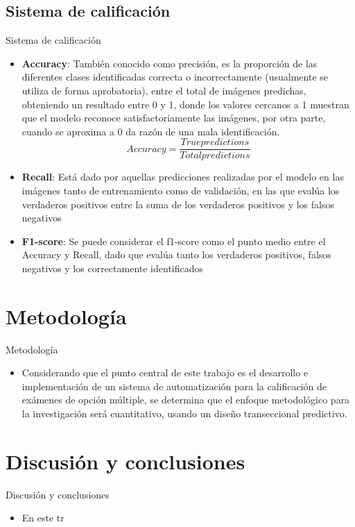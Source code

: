 \documentclass{beamer}
\begin{document}
\subsection{Sistema de calificación}
\begin{frame}{Sistema de calificación}
    \begin{itemize}
        \item \textbf{Accuracy}: También conocido como precisión, es la proporción de las diferentes clases identificadas correcta o incorrectamente (usualmente se utiliza de forma aprobatoria), entre el total de imágenes predichas, obteniendo un resultado entre 0 y 1, donde los valores cercanos a 1 muestran que el modelo reconoce satisfactoriamente las imágenes, por otra parte, cuando se aproxima a 0 da razón de una mala identificación.    
        \[
        Accuracy = \frac{True predictions}{Total predictions}
        \]
        \item \textbf{Recall}: Está dado por aquellas predicciones realizadas por el modelo en las imágenes tanto de entrenamiento como de validación, en las que evalúa los verdaderos positivos entre la suma de los verdaderos positivos y los falsos negativos
        \item \textbf{F1-score}: Se puede considerar el f1-score como el punto medio entre el Accuracy y Recall, dado que evalúa tanto los verdaderos positivos, falsos negativos y los correctamente identificados
    \end{itemize}
\end{frame}


\section{Metodología}
\begin{frame}{Metodología}
    \begin{itemize}
        \item Considerando que el punto central de este trabajo es el desarrollo e implementación de un sistema de
        automatización para la calificación de exámenes de opción múltiple, se determina que el enfoque
        metodológico para la investigación será cuantitativo, usando un diseño transeccional predictivo.
    \end{itemize}    
\end{frame}


\section{Discusión y conclusiones}
\begin{frame}{Discusión y conclusiones}
    \begin{itemize}
        \item En este tr

    \end{itemize}
\end{frame}
\end{document}
